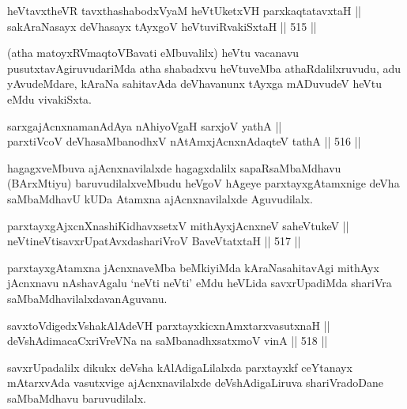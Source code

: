 
\begin{shl}
heVtavxtheVR tavxthashabodxV\s yaM heVtUketxVH parxkaqtatavxtaH || \\
sakAraNasayx deVhasayx tAyxgoV heVtuviRvakiSxtaH \hfill || 515 ||  
\end{shl}

\begin{artha}
(atha matoyxRV\s maqtoVBavati eMbuvalilx) heVtu vacanavu
pusutxtavAgiruvudariMda atha shabadxvu heVtuveMba athaRdalilxruvudu,
adu yAvudeMdare, kAraNa sahitavAda deVhavanunx tAyxga mADuvudeV heVtu
eMdu vivakiSxta.
\end{artha}

\begin{shl}
sarxgajAcnxnamanAdAya nAhiyoVgaH sarxjoV yathA || \\
parxtiVcoV deVhasaMbanodhxV nA\s \s tAmxjAcnxnAdaqteV tathA \hfill || 516 ||  
\end{shl}

\begin{artha}
hagagxveMbuva ajAcnxnavilalxde hagagxdalilx sapaRsaMbaMdhavu\break
(BArxMtiyu) baruvudilalxveMbudu heVgoV hAgeye parxtayxgAtamxnige deVha
saMbaMdhavU kUDa Atamxna ajAcnxnavilalxde Aguvudilalx.
\end{artha}

\begin{shl}
parxtayxgAjxcnXnashiKidhavxsetxV mithAyxjAcnxneV saheVtukeV || \\
neVtineVtisavxrUpatAvxdashariVroV BaveVtatxtaH \hfill || 517 ||  
\end{shl}

\begin{artha}
parxtayxgAtamxna jAcnxnaveMba beMkiyiMda kAraNasahitavAgi mithAyx
jAcnxnavu nAshavAgalu `neVti neVti' eMdu heVLida savxrUpadiMda
shariVra saMbaMdhavilalxdavanAguvanu.
\end{artha}

\begin{shl}
savxtoV\s digedxVshakAlAdeVH parxtayxkicxnAmxtarxvasutxnaH || \\
deVshAdimacaCxriVreVNa na saMbanadhxsatxmoV vinA \hfill || 518 ||  
\end{shl}

\begin{artha}
savxrUpadalilx dikukx deVsha kAlAdigaLilalxda parxtayxkf ceYtanayx
mAtarxvAda vasutxvige ajAcnxnavilalxde deVshAdigaLiruva shariVradoDane
saMbaMdhavu baruvudilalx.
\end{artha}


